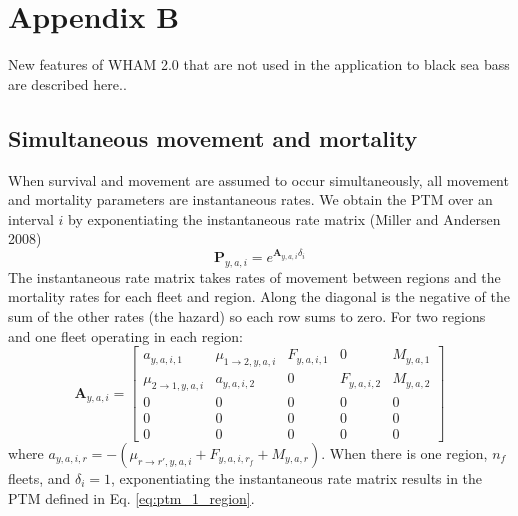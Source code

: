\documentclass[
]{article}
\begin{document}
\setcounter{table}{0}
\renewcommand\thetable{A\arabic{table}}


\hypertarget{appendix-b}{%
\section*{Appendix B}\label{appendix-b}}

New features of WHAM 2.0 that are not used in the application to black sea bass are described here..

\hypertarget{simultaneous-movement-and-mortality}{%
\subsection*{Simultaneous movement and mortality}\label{simultaneous-movement-and-mortality}}

When survival and movement are assumed to occur simultaneously, all movement and mortality parameters are instantaneous rates. We obtain the PTM over an interval \(i\) by exponentiating the instantaneous rate matrix (Miller and Andersen 2008)
\begin{equation*}
\mathbf{P}_{y,a,i} = e^{\mathbf{A}_{y,a,i}\delta_i}
\end{equation*}
The instantaneous rate matrix takes rates of movement between regions and the mortality rates for each fleet and region. Along the diagonal is the negative of the sum of the other rates (the hazard) so each row sums to zero. For two regions and one fleet operating in each region:
\begin{equation*}
 \mathbf{A}_{y,a,i} = \begin{bmatrix}
 a_{y,a,i,1} & \mu_{1\rightarrow 2,y,a,i} & F_{y,a,i,1} & 0 & M_{y,a,1} \\
 \mu_{2\rightarrow 1,y,a,i} &  a_{y,a,i,2} & 0 & F_{y,a,i,2} & M_{y,a,2} \\
 0 & 0 & 0 & 0 & 0 \\
 0 & 0 & 0 & 0 & 0 \\
 0 & 0 & 0 & 0 & 0
 \end{bmatrix}
\end{equation*}
where \(a_{y,a,i,r} = -(\mu_{r\rightarrow r',y,a,i} + F_{y,a,i,r_f} + M_{y,a,r})\). When there is one region, \(n_f\) fleets, and \(\delta_i = 1\), exponentiating the instantaneous rate matrix results in the PTM defined in Eq. \ref{eq:ptm_1_region}.
\end{document}

